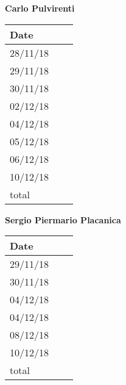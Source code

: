 \documentclass[../main.tex]{subfiles}
\begin{document}
\begin{center}
	{\bf Carlo Pulvirenti}
	\vspace{2mm}

		\begin{tabular}{p{1.3cm}|p{1.8cm}|p{6.7cm}}
			\hline
			\bf Date & \bf \makebox[1.8cm][c]{Hours} & \bf \makebox[6.7cm][c]{Description} \\
			\hline
			28/11/18 & \makebox[1.8cm][c]{1h} & \makebox[6.7cm][c]{Architectural Design}\\
			29/11/18 & \makebox[1.8cm][c]{3h} & \makebox[6.7cm][c]{Runtime View}\\
			30/11/18 & \makebox[1.8cm][c]{2h} & \makebox[6.7cm][c]{Runtime View}\\
			02/12/18 & \makebox[1.8cm][c]{4h} & \makebox[6.7cm][c]{Runtime View}\\
			04/12/18 & \makebox[1.8cm][c]{2h} & \makebox[6.7cm][c]{Reviewing}\\
			05/12/18 & \makebox[1.8cm][c]{3h} & \makebox[6.7cm][c]{Deployment View}\\
			06/12/18 & \makebox[1.8cm][c]{4h} & \makebox[6.7cm][c]{Component Interfaces}\\
			10/12/18 & \makebox[1.8cm][c]{3h} & \makebox[6.7cm][c]{Reviewing}\\
			total    & \makebox[1.8cm][c]{22h}
		\end{tabular}
\end{center}

\vspace{1cm}

\newpage

\begin{center}
	{\bf Sergio Piermario Placanica}
	\vspace{2mm}

		\begin{tabular}{p{1.3cm}|p{1.8cm}|p{6.7cm}}
			\hline
			\bf Date & \bf \makebox[1.8cm][c]{Hours} & \bf \makebox[6.7cm][c]{Description} \\
			\hline
			29/11/18 & \makebox[1.8cm][c]{2h} & \makebox[6.7cm][c]{Architechtural Design}\\
			30/11/18 & \makebox[1.8cm][c]{1h} & \makebox[6.7cm][c]{Architectural Design}\\
			04/12/18 & \makebox[1.8cm][c]{2h} & \makebox[6.7cm][c]{Reviewing}\\
			04/12/18 & \makebox[1.8cm][c]{3h} & \makebox[6.7cm][c]{Implementation and Testing}\\
			08/12/18 & \makebox[1.8cm][c]{3h} & \makebox[6.7cm][c]{UX diagram}\\
			10/12/18 & \makebox[1.8cm][c]{4h} & \makebox[6.7cm][c]{Reviewing}\\
			total    & \makebox[1.8cm][c]{14h}
		\end{tabular}
	\end{center}
\end{document}
